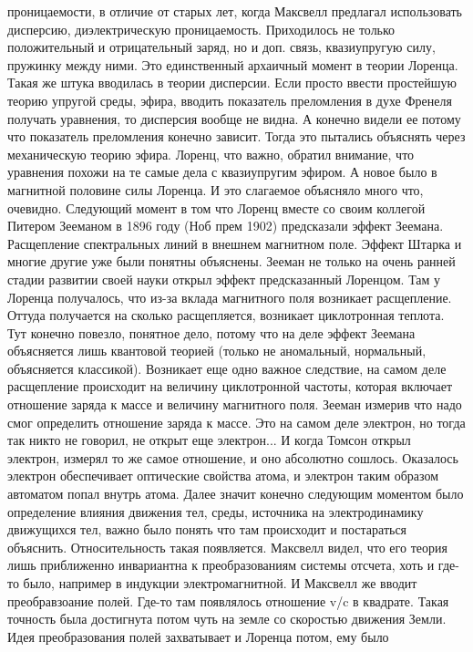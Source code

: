 \documentclass[a4paper, 12pt]{article}
\begin{document}
проницаемости, в отличие от старых лет, когда Максвелл предлагал 
использовать дисперсию, диэлектрическую проницаемость. Приходилось не 
только положительный и отрицательный заряд, но и доп. связь, 
квазиупругую силу, пружинку между ними. Это единственный архаичный 
момент в теории Лоренца. Такая же штука вводилась в теории дисперсии. 
Если просто ввести простейшую теорию упругой среды, эфира, вводить 
показатель преломления в духе Френеля получать уравнения, то дисперсия 
вообще не видна. А конечно видели ее потому что показатель преломления 
конечно зависит. Тогда это пытались объяснять через механическую теорию 
эфира. Лоренц, что важно, обратил внимание, что уравнения похожи на те 
самые дела с квазиупругим эфиром. А новое было в магнитной половине силы 
Лоренца. И это слагаемое объясняло много что, очевидно. Следующий момент 
в том что Лоренц вместе со своим коллегой Питером Зееманом в 1896 году 
(Ноб прем 1902) предсказали эффект Зеемана. Расщепление спектральных 
линий в внешнем магнитном поле. Эффект Штарка и многие другие уже были 
понятны объяснены. Зееман не только на очень ранней стадии развитии 
своей науки открыл эффект предсказанный Лоренцом. Там у Лоренца 
получалось, что из-за вклада магнитного поля возникает расщепление. 
Оттуда получается на сколько расщепляется, возникает циклотронная 
теплота. Тут конечно повезло, понятное дело, потому что на деле эффект 
Зеемана объясняется лишь квантовой теорией (только не аномальный, 
нормальный, объясняется классикой). Возникает еще одно важное следствие, 
на самом деле расщепление происходит на величину циклотронной частоты, 
которая включает отношение заряда к массе и величину магнитного поля. 
Зееман измерив что надо смог определить отношение заряда к массе. Это на 
самом деле электрон, но тогда так никто не говорил, не открыт еще 
электрон... И когда Томсон открыл электрон, измерял то же самое 
отношение, и оно абсолютно сошлось. Оказалось электрон обеспечивает 
оптические свойства атома, и электрон таким образом автоматом попал 
внутрь атома. Далее значит конечно следующим моментом было определение 
влияния движения тел, среды, источника на электродинамику движущихся 
тел, важно было понять что там происходит и постараться объяснить. 
Относительность такая появляется. Максвелл видел, что его теория лишь 
приближенно инвариантна к преобразованиям системы отсчета, хоть и где-то 
было, например в индукции электромагнитной. И Максвелл же вводит 
преобравзоание полей. Где-то там появлялось отношение v/c в квадрате. 
Такая точность была достигнута потом чуть на земле со скоростью движения 
Земли. Идея преобразования полей захватывает и Лоренца потом, ему было 
\end{document}
